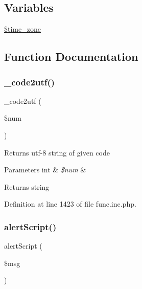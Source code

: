 \subsection*{Variables}
\begin{DoxyCompactItemize}
\item 
\hyperlink{func_8inc_8php_adce4610b55a895abff73b5ed259c4bd3}{\$time\+\_\+zone}
\end{DoxyCompactItemize}


\subsection{Function Documentation}
\mbox{\label{func_8inc_8php_a07446b33f4eda53315b12fc1c1b15f5a}} 
\subsubsection{\texorpdfstring{\+\_\+code2utf()}{\_code2utf()}}
{\footnotesize\ttfamily \+\_\+code2utf (\begin{DoxyParamCaption}\item[{}]{\$num }\end{DoxyParamCaption})}

Returns utf-\/8 string of given code


\begin{DoxyParams}[1]{Parameters}
int & {\em \$num} & \\
\hline
\end{DoxyParams}
\begin{DoxyReturn}{Returns}
string 
\end{DoxyReturn}


Definition at line 1423 of file func.\+inc.\+php.

\mbox{\label{func_8inc_8php_acc16be2ad7371ac6478f2314f1248fe2}} 
\subsubsection{\texorpdfstring{alert\+Script()}{alertScript()}}
{\footnotesize\ttfamily alert\+Script (\begin{DoxyParamCaption}\item[{}]{\$msg }\end{DoxyParamCaption})}

